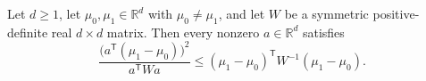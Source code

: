 \begin{theorem}
Let $d\geq1$, let $\mu_0,\mu_1\in\mathbb R^d$ with
$\mu_0\ne\mu_1$, and let $W$ be a symmetric positive-definite real
$d\times d$ matrix.  Then every nonzero $a\in\mathbb R^d$ satisfies
\[
  \frac{\bigl(a^{\mathsf T}(\mu_1-\mu_0)\bigr)^2}
       {a^{\mathsf T}Wa}
  \leq
  (\mu_1-\mu_0)^{\mathsf T}W^{-1}(\mu_1-\mu_0).
\]
\end{theorem}
